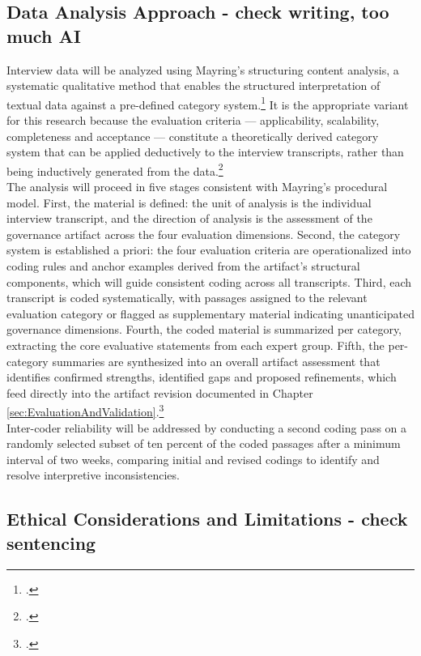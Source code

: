 \subsection{Data Analysis Approach - check writing, too much AI}
\label{subsec:DataAnalysisApproach}
Interview data will be analyzed using Mayring's structuring content analysis, a systematic qualitative method that enables the structured interpretation of textual data against a pre-defined category system.\footcite[69-75]{mayringQualitativeContentAnalysis2014}
It is the appropriate variant for this research because the evaluation criteria — applicability, scalability, completeness and acceptance — constitute a theoretically derived category system that can be applied deductively to the interview transcripts, rather than being inductively generated from the data.\footcite[75-77]{mayringQualitativeContentAnalysis2014}
\\
The analysis will proceed in five stages consistent with Mayring's procedural model.
First, the material is defined: the unit of analysis is the individual interview transcript, and the direction of analysis is the assessment of the governance artifact across the four evaluation dimensions.
Second, the category system is established a priori: the four evaluation criteria are operationalized into coding rules and anchor examples derived from the artifact's structural components, which will guide consistent coding across all transcripts.
Third, each transcript is coded systematically, with passages assigned to the relevant evaluation category or flagged as supplementary material indicating unanticipated governance dimensions.
Fourth, the coded material is summarized per category, extracting the core evaluative statements from each expert group.
Fifth, the per-category summaries are synthesized into an overall artifact assessment that identifies confirmed strengths, identified gaps and proposed refinements, which feed directly into the artifact revision documented in Chapter \ref{sec:EvaluationAndValidation}.\footcite[83-90]{mayringQualitativeContentAnalysis2014}
\\
Inter-coder reliability will be addressed by conducting a second coding pass on a randomly selected subset of ten percent of the coded passages after a minimum interval of two weeks, comparing initial and revised codings to identify and resolve interpretive inconsistencies.

\subsection{Ethical Considerations and Limitations - check sentencing}
\label{subsec:EthicalConsiderationsAndLimitations}

